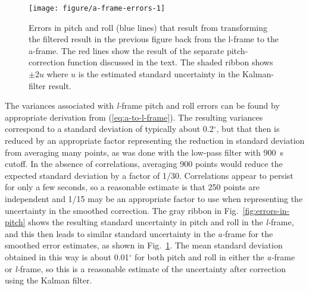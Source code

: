 \documentclass[12pt,twoside,english,12pt,twoside,english]{article}\usepackage[]{graphicx}\usepackage[]{color}
\makeatletter
\def\maxwidth{ %
  \ifdim\Gin@nat@width>\linewidth
    \linewidth
  \else
    \Gin@nat@width
  \fi
}
\newenvironment{knitrout}{}{} %
\let\OrgIndex\index
\renewcommand*{\index}[1]{\OrgIndex{#1}}
\makeatother
\begin{document}
\begin{knitrout}
\color{fgcolor}\begin{figure}

{\centering \texttt{[image: figure/a-frame-errors-1]} 

}

\caption[Errors in pitch and roll that result from transforming the filtered result in the previous figure back from the l-frame to the a-frame.]{Errors in pitch and roll (blue lines) that result from transforming the filtered result in the previous figure back from the l-frame to the a-frame. The red lines show the result of the separate pitch-correction function discussed in the text. The shaded ribbon shows $\pm2u$ where $u$ is the estimated standard uncertainty in the Kalman-filter result.}\label{fig:a-frame-errors}
\end{figure}


\end{knitrout}

The variances associated with \emph{l-}frame
pitch and roll errors can be found by appropriate derivation from
(\ref{eq:a-to-l-frame}). The resulting variances correspond to a
standard deviation of
typically about 0.2$^{\circ}$, but that then is reduced by an appropriate
factor representing the reduction in standard deviation from averaging
many points, as was done with the low-pass filter with 900~s cutoff.
In the absence of correlations, averaging 900 points would reduce
the expected standard deviation by a factor of 1/30. Correlations
appear to persist for only a few seconds, so a reasonable estimate
is that 250 points are independent and 1/15 may be
an appropriate factor to use when representing the uncertainty
in the smoothed correction. The gray ribbon in Fig.~\ref{fig:errors-in-pitch}
shows the resulting standard
uncertainty in pitch and roll in the \emph{l-}frame,
and this then leads to similar standard uncertainty in the \emph{a-}frame
for the smoothed error
estimates, as shown in Fig.~\ref{fig:a-frame-errors}.
The mean standard deviation obtained in this way is about 0.01$^{\circ}$
for both pitch and roll in either the \emph{a-}frame or \emph{l-}frame,
so this is a reasonable estimate of the uncertainty after correction
using the Kalman filter.
\end{document}
